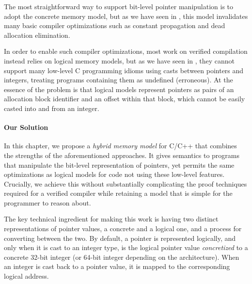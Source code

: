 The most straightforward way to support bit-level pointer manipulation is to adopt the concrete
memory model, but as we have seen in , this model
invalidates many basic compiler optimizations such as constant propagation and dead allocation
elimination. 


In order to enable such compiler optimizations, most work on verified compilation instead relies on
logical memory models, but as we have seen in , they cannot support many
low-level C programming idioms using casts between pointers and integers, treating programs
containing them as undefined (\ie erroneous).  At the essence of the problem is that logical models
represent pointers as pairs of an allocation block identifier and an offset within that block, which
cannot be easily casted into and from an integer.



\paragraph{Our Solution}

In this chapter, we propose a \emph{hybrid memory model} for C/C++ that combines the strengths of the
aforementioned approaches. It gives semantics to programs that manipulate the bit-level
representation of pointers, yet permits the same optimizations as logical models for code not using
these low-level features. Crucially, we achieve this without substantially complicating the proof
techniques required for a verified compiler while retaining a model that is simple for the
programmer to reason about.

The key technical ingredient for making this work is having two
distinct representations of pointer values, a concrete and a logical one,
and a process for converting between the two.
By default, a pointer is represented logically, and only when it is
cast to an integer type, is the logical pointer value
\emph{concretized} to a concrete 32-bit integer (or 64-bit integer depending on the architecture).
When an integer is cast back to a pointer value, 
it is mapped to the corresponding logical address.

